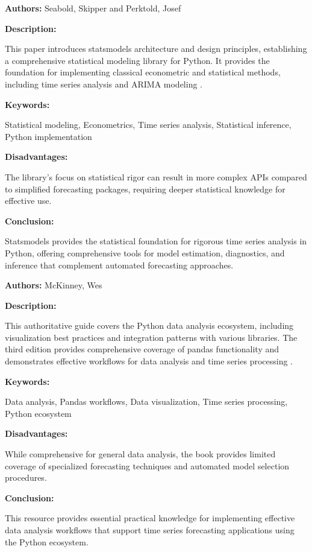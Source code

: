 
{ 
	
	\textbf{Authors:} Seabold, Skipper and Perktold, Josef
	
	\textbf{Description:}
	
	This paper introduces statsmodels architecture and design principles, establishing a comprehensive statistical modeling library for Python. It provides the foundation for implementing classical econometric and statistical methods, including time series analysis and ARIMA modeling \autocite{Seabold:2010}.
	
	\textbf{Keywords:}
	
	Statistical modeling, Econometrics, Time series analysis, Statistical inference, Python implementation
	
	\textbf{Disadvantages:}
	
	The library's focus on statistical rigor can result in more complex APIs compared to simplified forecasting packages, requiring deeper statistical knowledge for effective use.
	
	\textbf{Conclusion:}
	
	Statsmodels provides the statistical foundation for rigorous time series analysis in Python, offering comprehensive tools for model estimation, diagnostics, and inference that complement automated forecasting approaches.
	
}


{ 
	
	\textbf{Authors:} McKinney, Wes
	
	\textbf{Description:} 
	
	This authoritative guide covers the Python data analysis ecosystem, including visualization best practices and integration patterns with various libraries. The third edition provides comprehensive coverage of pandas functionality and demonstrates effective workflows for data analysis and time series processing \autocite{McKinney:2023}.
	
	\textbf{Keywords:} 
	
	Data analysis, Pandas workflows, Data visualization, Time series processing, Python ecosystem
	
	\textbf{Disadvantages:} 
	
	While comprehensive for general data analysis, the book provides limited coverage of specialized forecasting techniques and automated model selection procedures.
	
	\textbf{Conclusion:} 
	
	This resource provides essential practical knowledge for implementing effective data analysis workflows that support time series forecasting applications using the Python ecosystem.
	
}

